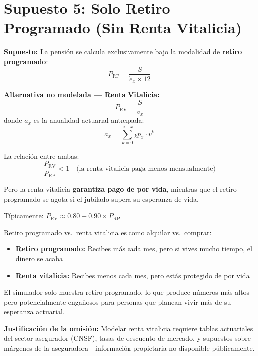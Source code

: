 \documentclass[11pt,a4paper]{report}
\begin{document}
\section{Supuesto 5: Solo Retiro Programado (Sin Renta Vitalicia)}

\begin{tcolorbox}[colback=blue!5!white, colframe=blue!75!black, title=\textbf{Definici\'on Formal}]
\textbf{Supuesto:} La pensi\'on se calcula exclusivamente bajo la modalidad de \textbf{retiro programado}:
\[
  P_{\text{RP}} = \frac{S}{\mathring{e}_x \times 12}
\]

\textbf{Alternativa no modelada --- Renta Vitalicia:}
\[
  P_{\text{RV}} = \frac{S}{\ddot{a}_x}
\]
donde $\ddot{a}_x$ es la anualidad actuarial anticipada:
\[
  \ddot{a}_x = \sum_{k=0}^{\omega-x} {}_kp_x \cdot v^k
\]

La relaci\'on entre ambas:
\[
  \frac{P_{\text{RV}}}{P_{\text{RP}}} < 1 \quad \text{(la renta vitalicia paga menos mensualmente)}
\]

Pero la renta vitalicia \textbf{garantiza pago de por vida}, mientras que el retiro programado se agota si el jubilado supera su esperanza de vida.

T\'ipicamente: $P_{\text{RV}} \approx 0.80 - 0.90 \times P_{\text{RP}}$
\end{tcolorbox}

\begin{tcolorbox}[colback=green!5!white, colframe=green!50!black, title=\textbf{Intuici\'on}]
Retiro programado vs.\ renta vitalicia es como alquilar vs.\ comprar:
\begin{itemize}
  \item \textbf{Retiro programado:} Recibes m\'as cada mes, pero si vives mucho tiempo, el dinero se acaba
  \item \textbf{Renta vitalicia:} Recibes menos cada mes, pero est\'as protegido de por vida
\end{itemize}

El simulador solo muestra retiro programado, lo que produce n\'umeros m\'as altos pero potencialmente enga\~nosos para personas que planean vivir m\'as de su esperanza actuarial.

\textbf{Justificaci\'on de la omisi\'on:} Modelar renta vitalicia requiere tablas actuariales del sector asegurador (CNSF), tasas de descuento de mercado, y supuestos sobre m\'argenes de la aseguradora---informaci\'on propietaria no disponible p\'ublicamente.
\end{tcolorbox}
\end{document}
